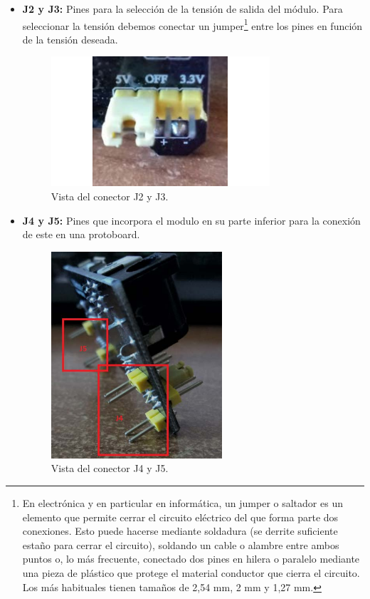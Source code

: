 \begin{itemize}
  \item \textbf{J2 y J3:} Pines para la selección de la tensión de salida del módulo. Para seleccionar la tensión debemos conectar un jumper\footnote{En electrónica y en particular en informática,
   un jumper o saltador es un elemento que permite cerrar el circuito eléctrico del que forma parte dos conexiones. Esto puede hacerse mediante soldadura (se derrite suficiente estaño para cerrar el circuito), soldando un cable o alambre entre ambos puntos o, lo más frecuente, conectado dos pines en hilera o paralelo mediante una pieza de plástico que protege el material conductor que cierra el circuito. Los más habituales tienen tamaños de 2,54 mm, 2 mm y 1,27 mm. } entre los pines en función de la
  tensión deseada.

   \begin{figure}[H]
  \begin{center}
    \includegraphics[scale=0.5]{imagenes/usb_board_vout.png}
  \end{center}
  \caption{Vista del conector J2 y J3.}
  \label{figura:conector_usb_board_vout}
\end{figure}

\item \textbf{J4 y J5:} Pines que incorpora el modulo en su parte inferior para la conexión de este en 
una protoboard.

   \begin{figure}[H]
  \begin{center}
    \includegraphics[scale=0.5]{imagenes/pin_usb_board.png}
  \end{center}
  \caption{Vista del conector J4 y J5.}
  \label{figura:conector_usb_board}
\end{figure}
  
\end{itemize}


